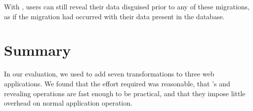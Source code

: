 %
With \sys, users can still reveal their data disguised prior to any of these
migrations, as if the migration had occurred with their data present in the
database.


%
\section{Summary}
In our evaluation, we used \sys to add seven \xxing transformations to three web
applications. We found that the effort required was reasonable, that \sys's
\xxing and revealing operations are fast enough to be practical, and that they
impose little overhead on normal application operation.
%
